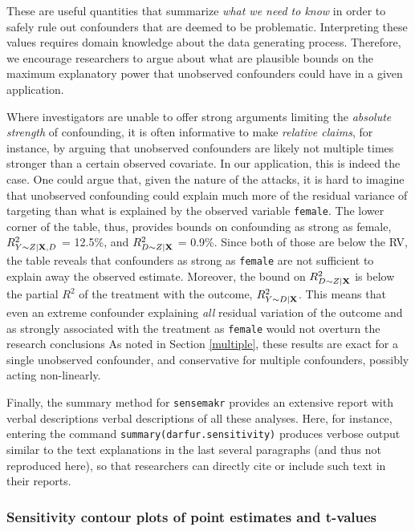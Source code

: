 \documentclass[
]{jss}
\begin{document}
These are useful quantities that summarize \emph{what we need to know}
in order to safely rule out confounders that are deemed to be
problematic. Interpreting these values requires domain knowledge about
the data generating process. Therefore, we encourage researchers to
argue about what are plausible bounds on the maximum explanatory power
that unobserved confounders could have in a given application.

Where investigators are unable to offer strong arguments limiting the
\emph{absolute strength} of confounding, it is often informative to make
\emph{relative claims}, for instance, by arguing that unobserved
confounders are likely not multiple times stronger than a certain
observed covariate. In our application, this is indeed the case. One
could argue that, given the nature of the attacks, it is hard to imagine
that unobserved confounding could explain much more of the residual
variance of targeting than what is explained by the observed variable
\texttt{female}. The lower corner of the table, thus, provides bounds on
confounding as strong as female, \(R^2_{Y\sim Z| {\bf X}, D}\) = 12.5\%,
and \(R^2_{D\sim Z| {\bf X} }\) = 0.9\%. Since both of those are below
the RV, the table reveals that confounders as strong as \texttt{female}
are not sufficient to explain away the observed estimate. Moreover, the
bound on \(R^2_{D\sim Z| {\bf X} }\) is below the partial \(R^2\) of the
treatment with the outcome, \(R^2_{Y \sim D |{\bf X}}\). This means that
even an extreme confounder explaining \emph{all} residual variation of
the outcome and as strongly associated with the treatment as
\texttt{female} would not overturn the research conclusions As noted in
Section \ref{multiple}, these results are exact for a single unobserved
confounder, and conservative for multiple confounders, possibly acting
non-linearly.

Finally, the summary method for \texttt{sensemakr} provides an extensive
report with verbal descriptions verbal descriptions of all these
analyses. Here, for instance, entering the command
\texttt{summary(darfur.sensitivity)} produces verbose output similar to
the text explanations in the last several paragraphs (and thus not
reproduced here), so that researchers can directly cite or include such
text in their reports.

\hypertarget{sensitivity-contour-plots-of-point-estimates-and-t-values}{%
\subsubsection{Sensitivity contour plots of point estimates and
t-values}\label{sensitivity-contour-plots-of-point-estimates-and-t-values}}
\end{document}

